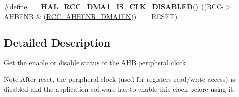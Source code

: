 \begin{DoxyCompactItemize}
\item 
\hypertarget{group___r_c_c___a_h_b___peripheral___clock___enable___disable___status_gae89d94d6252c79e450623f69eb939ed6}{\#define {\bfseries \-\_\-\-\_\-\-H\-A\-L\-\_\-\-R\-C\-C\-\_\-\-D\-M\-A1\-\_\-\-I\-S\-\_\-\-C\-L\-K\-\_\-\-D\-I\-S\-A\-B\-L\-E\-D}()~((R\-C\-C-\/$>$A\-H\-B\-E\-N\-R \& (\hyperlink{group___peripheral___registers___bits___definition_gac8c3053f1ce37c9f643f0e31471927ea}{R\-C\-C\-\_\-\-A\-H\-B\-E\-N\-R\-\_\-\-D\-M\-A1\-E\-N})) == R\-E\-S\-E\-T)}\label{group___r_c_c___a_h_b___peripheral___clock___enable___disable___status_gae89d94d6252c79e450623f69eb939ed6}

\end{DoxyCompactItemize}


\subsection{Detailed Description}
Get the enable or disable status of the A\-H\-B peripheral clock. \begin{DoxyNote}{Note}
After reset, the peripheral clock (used for registers read/write access) is disabled and the application software has to enable this clock before using it. 
\end{DoxyNote}

